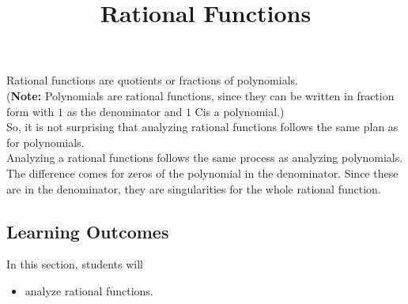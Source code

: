 \documentclass{ximera}
\title{Rational Functions}
\begin{document}
\begin{abstract}
\end{abstract}
\maketitle












Rational functions are quotients or fractions of polynomials.  \\


(\textbf{Note:} Polynomials are rational functions, since they can be written in fraction form with $1$ as the denominator and $1$ Cis a polynomial.)  \\


So, it is not surprising that analyzing rational functions follows the same plan as for polynomials. \\


Analyzing a rational functions follows the same process as analyzing polynomials.  The difference comes for zeros of the polynomial in the denominator.  Since these are in the denominator, they are singularities for the whole rational function.























\subsection{Learning Outcomes}


\begin{sectionOutcomes}
In this section, students will 

\begin{itemize}
\item analyze rational functions.
\end{itemize}
\end{sectionOutcomes}
\end{document}
